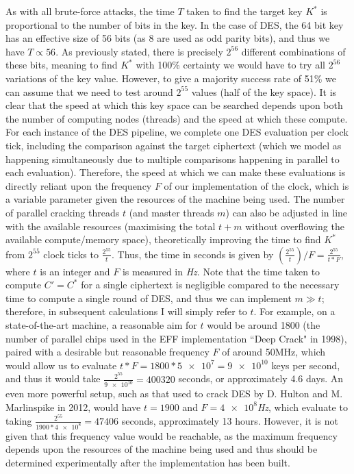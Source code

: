 \documentclass[a4paper, 11pt]{article}
\begin{document}
As with all brute-force attacks, the time $T$ taken to find the target key $K^{*}$ is proportional to the number of bits in the key. In the case of DES, the 64 bit key has an effective size of 56 bits (as 8 are used as odd parity bits), and thus we have $T \propto 56$. As previously stated, there is precisely $2^{56}$ different combinations of these bits, meaning to find $K^{*}$ with 100\% certainty we would have to try all  $2^{56}$ variations of the key value. However, to give a majority success rate of 51\% we can assume that we need to test around $2^{55}$ values (half of the key space). It is clear that the speed at which this key space can be searched depends upon both the number of computing nodes (threads) and the speed at which these compute. For each instance of the DES pipeline, we complete one DES evaluation per clock tick, including the comparison against the target ciphertext (which we model as happening simultaneously due to multiple comparisons happening in parallel to each evaluation). Therefore, the speed at which we can make these evaluations is directly reliant upon the frequency $F$ of our implementation of the clock, which is a variable parameter given the resources of the machine being used. The number of parallel cracking threads $t$ (and master threads $m$) can also be adjusted in line with the available resources (maximising the total $t+m$ without overflowing the available compute/memory space), theoretically improving the time to find $K^{*}$ from $2^{55}$ clock ticks to $\frac{2^{55}}{t}$. Thus, the time in seconds is given by $(\frac{2^{55}}{t})/F = \frac{2^{55}}{t*F}$, where $t$ is an integer and $F$ is measured in \emph{Hz}. Note that the time taken to compute $C' = C^{*}$ for a single ciphertext is negligible compared to the necessary time to compute a single round of DES, and thus we can implement $m \gg t$; therefore, in subsequent calculations I will simply refer to $t$. For example, on a state-of-the-art machine,  a reasonable aim for $t$ would be around 1800 (the number of parallel chips used in the EFF implementation ``Deep Crack" in 1998), paired with a desirable but reasonable frequency $F$ of around 50MHz, which would allow us to evaluate $t * F = 1800 * \num{5e7} = \num{9e10}$ keys per second, and thus it would take $\frac{2^{55}}{\num{9e10}} = 400320$ seconds, or approximately 4.6 days. An even more powerful setup, such as that used to crack DES by D. Hulton and M. Marlinspike in 2012, would have $t = 1900$ and $F = \num{4e8}$\emph{Hz}, which evaluate to taking $\frac{2^{55}}{1900 * \num{4e8}} = 47406$ seconds, approximately 13 hours. However, it is not given that this frequency value would be reachable, as the maximum frequency depends upon the resources of the machine being used and thus should be determined experimentally after the implementation has been built.

\nocite{*}


\end{document}
